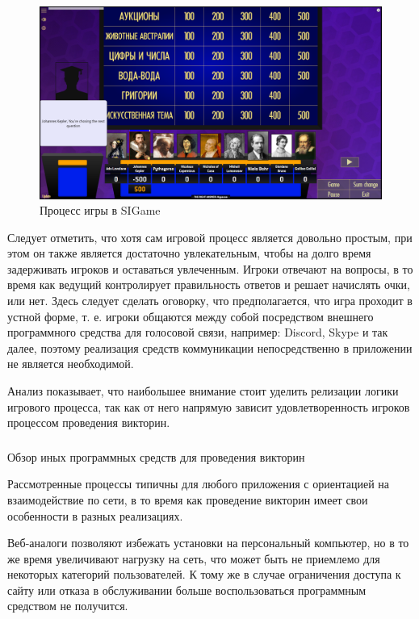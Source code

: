 \begin{figure}[!ht]
	\centering
	\includegraphics[scale=0.30]{attachments/sigame_game.png}  
	\caption{Процесс игры в SIGame}
	\label{sec:analysis:analogues:game:sigame_game}
\end{figure}

Следует отметить, что хотя сам игровой процесс является довольно простым, при этом он также является достаточно увлекательным, чтобы на долго время задерживать игроков и оставаться
увлеченным. Игроки отвечают на вопросы, в то время как ведущий контролирует правильность ответов и решает начислять очки, или нет. Здесь следует сделать оговорку, что предполагается,
что игра проходит в устной форме, т. е. игроки общаются между собой посредством внешнего программного средства для голосовой связи, например: Discord, Skype и так далее, поэтому реализация
средств коммуникации непосредственно в приложении не является необходимой.

Анализ показывает, что наибольшее внимание стоит уделить релизации логики игрового процесса, так как от него напрямую зависит удовлетворенность игроков процессом проведения викторин.

\subsubsection{} Обзор иных программных средств для проведения викторин
\label{sec:analysis:analogues:other_programs}

Рассмотренные процессы типичны для любого приложения с ориентацией на взаимодействие по сети, в то время как проведение викторин имеет свои особенности в разных реализациях.

Веб-аналоги позволяют избежать установки на персональный компьютер, но в то же время увеличивают нагрузку на сеть, что может быть не приемлемо для некоторых категорий пользователей.
К тому же в случае ограничения доступа к сайту или отказа в обслуживании больше воспользоваться программным средством не получится.

